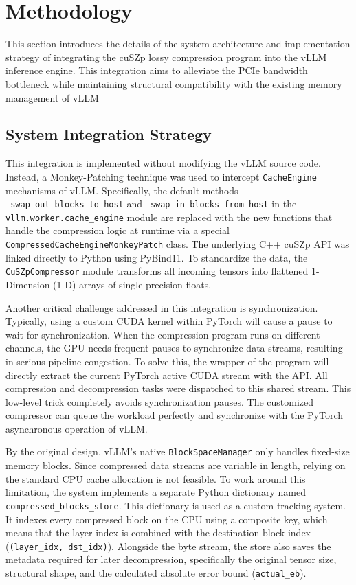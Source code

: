 \documentclass{polyu-comp}
\begin{document}
\section{Methodology}
\label{sec:methodology}

This section introduces the details of the system architecture and implementation strategy of integrating the cuSZp lossy compression program into the vLLM inference engine. This integration aims to alleviate the PCIe bandwidth bottleneck while maintaining structural compatibility with the existing memory management of vLLM

\subsection{System Integration Strategy}
This integration is implemented without modifying the vLLM source code. Instead, a Monkey-Patching technique was used to intercept \texttt{CacheEngine} mechanisms of vLLM. Specifically, the default methods \texttt{\_swap\_out\_blocks\_to\_host} and \texttt{\_swap\_in\_blocks\_from\_host} in the \texttt{vllm.worker.cache\_engine} module are replaced with the new functions that handle the compression logic at runtime via a special \texttt{CompressedCacheEngineMonkeyPatch} class. The underlying C++ cuSZp API was linked directly to Python using PyBind11. To standardize the data, the \texttt{CuSZpCompressor} module transforms all incoming tensors into flattened 1-Dimension (1-D) arrays of single-precision floats. 

Another critical challenge addressed in this integration is synchronization. Typically, using a custom CUDA kernel within PyTorch \cite{NEURIPS2019_bdbca288} will cause a pause to wait for synchronization. When the compression program runs on different channels, the GPU needs frequent pauses to synchronize data streams, resulting in serious pipeline congestion. To solve this, the wrapper of the program will directly extract the current PyTorch active CUDA stream with the  API. All compression and decompression tasks were dispatched to this shared stream. This low-level trick completely avoids synchronization pauses. The customized compressor can queue the workload perfectly and synchronize with the PyTorch asynchronous operation of vLLM.

By the original design, vLLM's native \texttt{BlockSpaceManager} only handles fixed-size memory blocks. Since compressed data streams are variable in length, relying on the standard CPU cache allocation is not feasible. To work around this limitation, the system implements a separate Python dictionary named \texttt{compressed\_blocks\_store}. This dictionary is used as a custom tracking system. It indexes every compressed block on the CPU using a composite key, which means that the layer index is combined with the destination block index (\texttt{(layer\_idx, dst\_idx)}). Alongside the byte stream, the store also saves the metadata required for later decompression, specifically the original tensor size, structural shape, and the calculated absolute error bound (\texttt{actual\_eb}).
\end{document}
